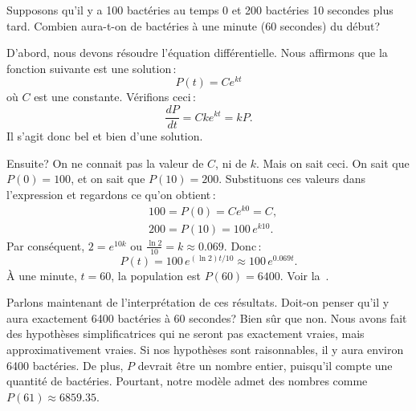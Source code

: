\begin{example}
Supposons qu'il y a 100 bact\'eries au temps 0 et 200 bact\'eries 10 secondes plus tard.  Combien aura-t-on de bact\'eries \`a une minute (60 secondes) du d\'ebut?

%
%
D'abord, nous devons r\'esoudre l'\'equation diff\'erentielle.  Nous affirmons que la fonction suivante est une solution\,: 
\begin{equation*}
P(t) = C e^{kt} 
\end{equation*}
o\`u $C$ est une constante.  V\'erifions ceci\,: 
\begin{equation*}
\frac{dP}{dt} = C k e^{kt} = k P .
\end{equation*}
Il s'agit donc bel et bien d'une solution.

Ensuite?  On ne connait pas la valeur de $C$, ni de $k$.  Mais on sait ceci.
On sait que $P(0) = 100$, et on sait que
$P(10) = 200$.  Substituons ces valeurs dans l'expression et regardons ce qu'on obtient\,: 
\begin{align*}
& 100 = P(0) = C e^{k0} = C ,\\
& 200 = P(10) = 100 \, e^{k10} .
\end{align*}
Par cons\'equent, $2 = e^{10k}$ ou $\frac{\ln 2}{10} = k \approx 0.069$.
Donc\,: 
\begin{equation*}
P(t) = 100 \, e^{(\ln 2) t / 10} \approx 100 \, e^{0.069 t} .
\end{equation*}
\`A une minute, $t=60$, la population est $P(60) = 6400$.  
Voir la~.
%
\begin{myfig}
\capstart
{}
\caption{Croissance de bact\'eries en 60 secondes.\label{intro:plotbactfig}}
\end{myfig}



Parlons maintenant de l'interpr\'etation de ces r\'esultats.  Doit-on penser qu'il y aura exactement 6400 bact\'eries \`a 60 secondes? Bien s\^ur que non.  Nous avons fait des hypoth\`eses simplificatrices qui ne seront pas exactement vraies, mais approximativement vraies.  Si nos hypoth\`eses sont raisonnables, il y aura environ 6400 bact\'eries.  De plus, $P$ devrait \^etre un nombre entier, puisqu'il compte une quantit\'e de bact\'eries.  Pourtant, notre mod\`ele admet des nombres comme $P(61) \approx 6859.35$.
\end{example}

